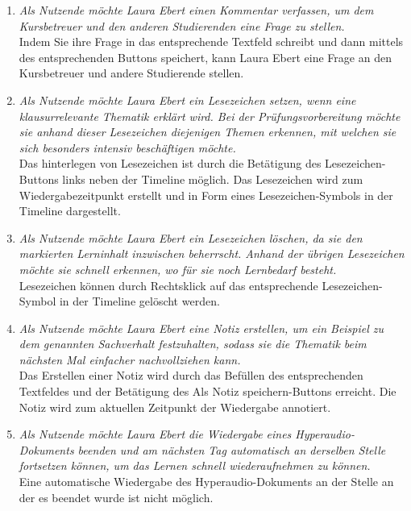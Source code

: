\begin{enumerate}[label=US-\arabic*:,ref=US-\arabic*]
\item \label{US-Kommentar-S} \textit{Als Nutzende möchte Laura Ebert einen Kommentar verfassen, um dem Kursbetreuer und den anderen Studierenden eine Frage zu stellen.}\\
Indem Sie ihre Frage in das entsprechende Textfeld schreibt und dann mittels des entsprechenden Buttons speichert, kann Laura Ebert eine Frage an den Kursbetreuer und andere Studierende stellen.

\item \label{US-Lesezeichen} \textit{Als Nutzende möchte Laura Ebert ein Lesezeichen setzen, wenn eine klausurrelevante Thematik erklärt wird. Bei der Prüfungsvorbereitung möchte sie anhand dieser Lesezeichen diejenigen Themen erkennen, mit welchen sie sich besonders intensiv beschäftigen möchte.}\\
Das hinterlegen von Lesezeichen ist durch die Betätigung des Lesezeichen-Buttons links neben der Timeline möglich. Das Lesezeichen wird zum Wiedergabezeitpunkt erstellt und in Form eines Lesezeichen-Symbols in der Timeline dargestellt.

\item \label{US-Lesezeichen-Loeschen} \textit{Als Nutzende möchte Laura Ebert ein Lesezeichen löschen, da sie den markierten Lerninhalt inzwischen beherrscht. Anhand der übrigen Lesezeichen möchte sie schnell erkennen, wo für sie noch Lernbedarf besteht.}\\
Lesezeichen können durch Rechtsklick auf das entsprechende Lesezeichen-Symbol in der Timeline gelöscht werden.

\item \label{US-Notiz-S} \textit{Als Nutzende möchte Laura Ebert eine Notiz erstellen, um ein Beispiel zu dem genannten Sachverhalt festzuhalten, sodass sie die Thematik beim nächsten Mal einfacher nachvollziehen kann.}\\
Das Erstellen einer Notiz wird durch das Befüllen des entsprechenden Textfeldes und der Betätigung des \glqq Als Notiz speichern\grqq{}-Buttons erreicht. Die Notiz wird zum aktuellen Zeitpunkt der Wiedergabe annotiert.

\item \label{US-Fortsetzen} \textit{Als Nutzende möchte Laura Ebert die Wiedergabe eines Hyperaudio-Dokuments beenden und am nächsten Tag automatisch an derselben Stelle fortsetzen können, um das Lernen schnell wiederaufnehmen zu können.}\\
Eine automatische Wiedergabe des Hyperaudio-Dokuments an der Stelle an der es beendet wurde ist nicht möglich.


\end{enumerate}
